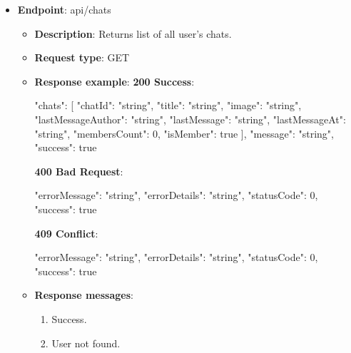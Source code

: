 \begin{itemize}
    \item \textbf{Endpoint}: api/chats
    \begin{itemize}
        \item \textbf{Description}: Returns list of all user's chats.
        \item \textbf{Request type}: GET
        \item \textbf{Response example}:
        \textbf{200 Success}:
        \begin{spverbatim}
        {
            "chats": [
                {
                "chatId": "string",
                "title": "string",
                "image": "string",
                "lastMessageAuthor": "string",
                "lastMessage": "string",
                "lastMessageAt": "string",
                "membersCount": 0,
                "isMember": true
            }
            ],
            "message": "string",
            "success": true
        }
        \end{spverbatim}
        \textbf{400 Bad Request}:
        \begin{spverbatim}
        {
            "errorMessage": "string",
            "errorDetails": "string",
            "statusCode": 0,
            "success": true
        }
        \end{spverbatim}
        \textbf{409 Conflict}:
        \begin{spverbatim}
        {
            "errorMessage": "string",
            "errorDetails": "string",
            "statusCode": 0,
            "success": true
        }
        \end{spverbatim}
        \item \textbf{Response messages}:
        \begin{enumerate}
            \item Success.
            \item User not found.
        \end{enumerate}
    \end{itemize}


\end{itemize}
